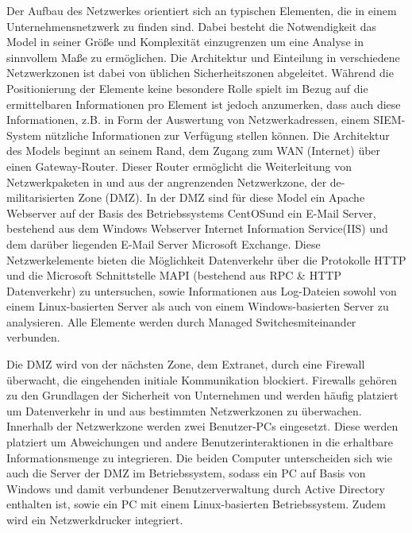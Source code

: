 Der Aufbau des Netzwerkes orientiert sich an typischen Elementen, die in einem Unternehmensnetzwerk zu finden sind. Dabei besteht die Notwendigkeit das Model in seiner Größe und Komplexität einzugrenzen um eine Analyse in sinnvollem Maße zu ermöglichen. 
Die Architektur und Einteilung in verschiedene Netzwerkzonen ist dabei von üblichen Sicherheitszonen abgeleitet. Während die Positionierung der Elemente keine besondere Rolle spielt im Bezug auf die ermittelbaren Informationen pro Element ist jedoch anzumerken, dass auch diese Informationen, z.B. in Form der Auswertung von Netzwerkadressen, einem SIEM-System nützliche Informationen zur Verfügung stellen können. Die Architektur des Models beginnt an seinem \glqq Rand\grqq, dem Zugang zum WAN (Internet) über einen Gateway-Router. Dieser Router ermöglicht die Weiterleitung von Netzwerkpaketen in und aus der angrenzenden Netzwerkzone, der de-militarisierten Zone (DMZ). 
In der DMZ sind für diese Model ein Apache Webserver auf der Basis des Betriebssystems \glqq CentOS\grqq und ein E-Mail Server, bestehend aus dem Windows Webserver \glqq Internet Information Service\grqq (IIS) und dem darüber liegenden E-Mail Server \glqq Microsoft Exchange\grqq. Diese Netzwerkelemente bieten die Möglichkeit Datenverkehr über die Protokolle HTTP und die Microsoft Schnittstelle MAPI (bestehend aus RPC \& HTTP Datenverkehr) zu untersuchen, sowie Informationen aus Log-Dateien sowohl von einem Linux-basierten Server als auch von einem Windows-basierten Server zu analysieren. Alle Elemente werden durch \glqq Managed Switches\grqq miteinander verbunden.

Die DMZ wird von der nächsten Zone, dem Extranet, durch eine Firewall überwacht, die eingehenden initiale Kommunikation blockiert. Firewalls gehören zu den Grundlagen der Sicherheit von Unternehmen und werden häufig platziert um Datenverkehr in und aus bestimmten Netzwerkzonen zu überwachen. Innerhalb der Netzwerkzone werden zwei Benutzer-PCs eingesetzt. Diese werden platziert um Abweichungen und andere Benutzerinteraktionen in die erhaltbare Informationsmenge zu integrieren. Die beiden Computer unterscheiden sich wie auch die Server der DMZ im Betriebssystem, sodass ein PC auf Basis von Windows und damit verbundener Benutzerverwaltung durch Active Directory enthalten ist, sowie ein PC mit einem Linux-basierten Betriebssystem. Zudem wird ein Netzwerkdrucker integriert.


